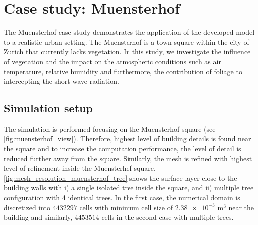 



 


\section{Case study: Muensterhof}

The Muensterhof case study demonstrates the application of the developed model to a realistic urban setting. The Muensterhof is a town square within the city of Zurich that currently lacks vegetation. In this study, we investigate the influence of vegetation and the impact on the atmospheric conditions such as air temperature, relative humidity and furthermore, the contribution of foliage to intercepting the short-wave radiation. 

\subsection{Simulation setup}
\label{sec:muenstersetup}

The simulation is performed focusing on the Muensterhof square (see \cref{fig:muensterhof_view}). Therefore, highest level of building details is found near the square and to increase the computation performance, the level of detail is reduced further away from the square. Similarly, the mesh is refined with highest level of refinement inside the Muensterhof square. \cref{fig:mesh_resolution_muensterhof_tree} shows the surface layer close to the building walls with i) a single isolated tree inside the square, and ii) multiple tree configuration with 4 identical trees. In the first case, the numerical domain is discretized into $\num{4432297}$ cells with minimum cell size of $\num{2.38e-3}$ m$^{3}$ near the building and similarly, $\num{4453514}$ cells in the second case with multiple trees.

